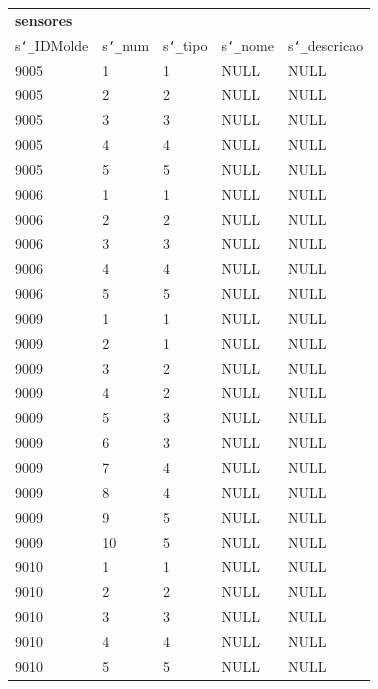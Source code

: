 \documentclass[11pt,twoside,a4paper]{report}
\begin{document}
\begin{table}
	\centering
	\begin{tabular}{|l|l|l|l|l|}
		\multicolumn{5}{l}{\textbf{sensores}}\\ \cline{1-5}
		s\texttt{\char`_}IDMolde & s\texttt{\char`_}num & s\texttt{\char`_}tipo & s\texttt{\char`_}nome & s\texttt{\char`_}descricao\\ \cline{1-5}
		9005 & 1 & 1 & NULL & NULL\\ \cline{1-5}
		9005 & 2 & 2 & NULL & NULL\\ \cline{1-5}
		9005 & 3 & 3 & NULL & NULL\\ \cline{1-5}
		9005 & 4 & 4 & NULL & NULL\\ \cline{1-5}
		9005 & 5 & 5 & NULL & NULL\\ \cline{1-5}
		9006 & 1 & 1 & NULL & NULL\\ \cline{1-5}
		9006 & 2 & 2 & NULL & NULL\\ \cline{1-5}
		9006 & 3 & 3 & NULL & NULL\\ \cline{1-5}
		9006 & 4 & 4 & NULL & NULL\\ \cline{1-5}
		9006 & 5 & 5 & NULL & NULL\\ \cline{1-5}
		9009 & 1 & 1 & NULL & NULL\\ \cline{1-5}
		9009 & 2 & 1 & NULL & NULL\\ \cline{1-5}
		9009 & 3 & 2 & NULL & NULL\\ \cline{1-5}
		9009 & 4 & 2 & NULL & NULL\\ \cline{1-5}
		9009 & 5 & 3 & NULL & NULL\\ \cline{1-5}
		9009 & 6 & 3 & NULL & NULL\\ \cline{1-5}
		9009 & 7 & 4 & NULL & NULL\\ \cline{1-5}
		9009 & 8 & 4 & NULL & NULL\\ \cline{1-5}
		9009 & 9 & 5 & NULL & NULL\\ \cline{1-5}
		9009 & 10 & 5 & NULL & NULL\\ \cline{1-5}
		9010 & 1 & 1 & NULL & NULL\\ \cline{1-5}
		9010 & 2 & 2 & NULL & NULL\\ \cline{1-5}
		9010 & 3 & 3 & NULL & NULL\\ \cline{1-5}
		9010 & 4 & 4 & NULL & NULL\\ \cline{1-5}
		9010 & 5 & 5 & NULL & NULL\\ \cline{1-5}

\end{tabular}
\end{table}
\end{document}
